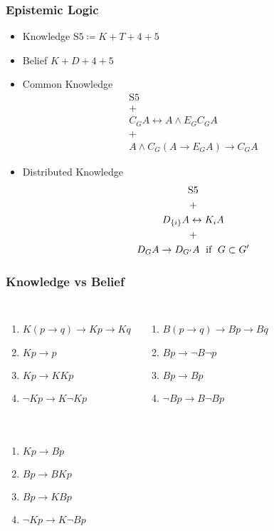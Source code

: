 \documentclass[UTF8,11pt,colorlinks,compress,openany]{beamer}%
\begin{document}
\begin{frame}\frametitle{Epistemic Logic}
\setlength\abovedisplayskip{0pt}
\setlength\belowdisplayskip{0pt}
\begin{itemize}
	\item Knowledge $\mathrm{S5}\coloneqq K+T+4+5$\\
	\begin{center}
	\end{center}
	\item Belief $K+D+4+5$
	\item Common Knowledge\vspace{-2ex}
	\begin{gather*}
	\mathrm{S5}\\
	+\\
	C_G A\leftrightarrow A\wedge E_GC_G A\\
	+\\
	A\wedge C_G(A\to E_G A)\to C_G A
	\end{gather*}
	\item Distributed Knowledge\vspace{-1ex}
	\begin{gather*}
	\mathrm{S5}\\
	+\\
	D_{\{i\}}A\leftrightarrow K_i A\\
	+\\
	D_G A\to D_{G'} A \mbox{\; if \;} G\subset G'
	\end{gather*}
\end{itemize}
\end{frame}

\begin{frame}\frametitle{Knowledge vs Belief}
\begin{columns}
\begin{enumerate}
	\item $K(p\to q)\to Kp\to Kq$
	\item $Kp\to p$
	\item $Kp\to KKp$
	\item $\neg Kp\to K\neg Kp$
\end{enumerate}
\begin{enumerate}
	\item $B(p\to q)\to Bp\to Bq$
	\item $Bp\to\neg B\neg p$
	\item $Bp\to Bp$
	\item $\neg Bp\to B\neg Bp$
\end{enumerate}
\end{columns}
\begin{columns}
\begin{enumerate}
	\item $Kp\to Bp$
	\item $Bp\to BKp$
	\item $Bp\to KBp$
	\item $\neg Kp\to K\neg Bp$
\end{enumerate}
\centerline{}
\end{columns}
\end{frame}
\end{document}
